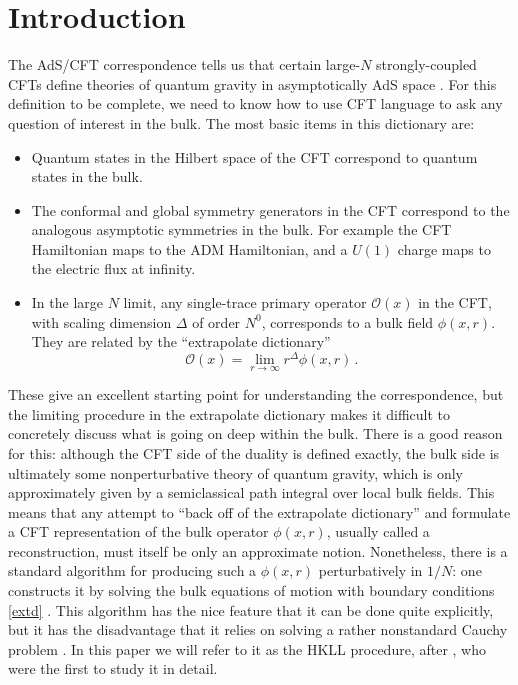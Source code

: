 \documentclass[aps,nofootinbib,longbibliography,superscriptaddress,12pt]{revtex4-1}
\newcommand{\be}{\begin{equation}}
\newcommand{\ee}{\end{equation}}
\newcommand{\bi}{\begin{itemize}}
\newcommand{\ei}{\end{itemize}}
\newcommand{\mO}{\mathcal{O}}
\begin{document}
\section{Introduction}
The AdS/CFT correspondence tells us that
certain
large-$N$ strongly-coupled CFTs define theories of quantum gravity in asymptotically AdS space \cite{Maldacena:1997re,Gubser:1998bc,Witten:1998qj,Banks:1998dd,Aharony:1999ti,Heemskerk:2009pn}.  For this definition to be complete, we need to know how to use CFT language to ask any question of interest in the bulk.  The most basic items in this dictionary are:
\bi
\item Quantum states in the Hilbert space of the CFT correspond to quantum states in the bulk.
\item The conformal and global symmetry generators in the CFT correspond to the analogous asymptotic symmetries in the bulk.  For example the CFT Hamiltonian maps to the ADM Hamiltonian, and a $U(1)$ charge maps to the electric flux at infinity.
\item  In the large $N$ limit, any single-trace primary operator $\mO(x)$ in the CFT, with scaling dimension $\Delta$ of order $N^0$, corresponds to a bulk field $\phi(x,r)$.  They are related by the ``extrapolate dictionary'' \cite{Banks:1998dd,Balasubramanian:1998de,Harlow:2011ke}
\be\label{extd}
\mO(x)=\lim_{r\to\infty} r^{\Delta}\phi(x,r) \,.
\ee
\ei
These give an excellent starting point for understanding the correspondence, but the limiting procedure in the extrapolate dictionary makes it difficult to concretely discuss what is going on deep within the bulk.  There is a good reason for this: although the CFT side of the duality is defined exactly, the bulk side is ultimately some nonperturbative theory of quantum gravity, which is only approximately given by a semiclassical path integral over local bulk fields.  This means that any attempt to ``back off of the extrapolate dictionary'' and formulate a CFT representation of the bulk operator $\phi(x,r)$, usually called a reconstruction, must itself be only an approximate notion.  Nonetheless, there is a standard algorithm for producing such a $\phi(x,r)$ perturbatively in $1/N$: one constructs it by solving the bulk equations of motion with boundary conditions \eqref{extd} \cite{Banks:1998dd,Hamilton:2006az,Kabat:2011rz,Heemskerk:2012mn,Kabat:2012hp,Heemskerk:2012np,Morrison:2014jha}.  This algorithm has the nice feature that it can be done quite explicitly, but it has the disadvantage that it relies on solving a rather nonstandard Cauchy problem \cite{Bousso:2012mh,Heemskerk:2012mn}.  In this paper we will refer to it as the HKLL procedure, after \cite{Hamilton:2006az}, who were the first to study it in detail.
\end{document}
